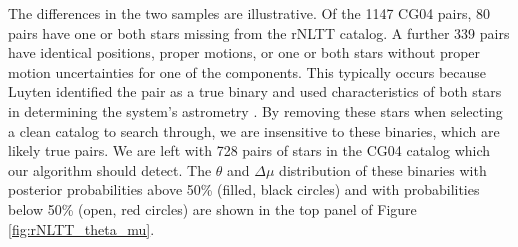 \documentclass[usenatbib]{mnras}
\newcommand{\given}{\,|\,}
\begin{document}






The differences in the two samples are illustrative. Of the 1147 CG04 pairs, 80 pairs have one or both stars missing from the rNLTT catalog. A further 339 pairs have identical positions, proper motions, or one or both stars without proper motion uncertainties for one of the components. This typically occurs because Luyten identified the pair as a true binary and used characteristics of both stars in determining the system's astrometry \citep{chaname04}. By removing these stars when selecting a clean catalog to search through, we are insensitive to these binaries, which are likely true pairs. We are left with 728 pairs of stars in the CG04 catalog which our algorithm should detect. The $\theta$ and $\Delta \mu$ distribution of these binaries with posterior probabilities above 50\% (filled, black circles) and with probabilities below 50\% (open, red circles) are shown in the top panel of Figure \ref{fig:rNLTT_theta_mu}. 
\end{document}

